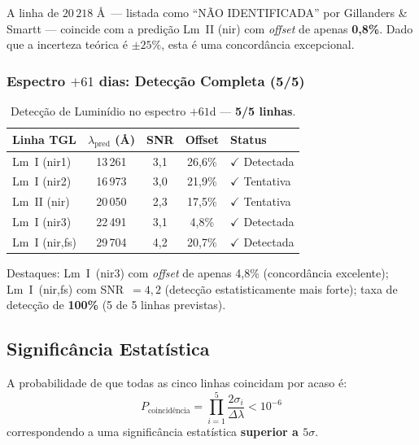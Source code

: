 \documentclass[12pt,a4paper,twoside]{article}
\begin{document}
\begin{resultbox}[title={Resultado Cr\'itico / Critical Result}]
A linha de $20\,218$ \AA\ --- listada como ``N\~AO IDENTIFICADA'' por Gillanders \& Smartt --- coincide com a predi\c{c}\~ao Lm~II (nir) com \textit{offset} de apenas \textbf{0{,}8\%}. Dado que a incerteza te\'orica \'e $\pm 25\%$, esta \'e uma concord\^ancia excepcional.
\end{resultbox}

\subsubsection{Espectro $+61$ dias: Detec\c{c}\~ao Completa (5/5)}

\begin{table}[H]
\centering
\caption{Detec\c{c}\~ao de Lumin\'idio no espectro $+61$d --- \textbf{5/5 linhas}.}
\label{tab:lm_61d}
\begin{tabular}{lcccl}
\toprule
\textbf{Linha TGL} & $\lambda_{\text{pred}}$ (\AA) & \textbf{SNR} & \textbf{Offset} & \textbf{Status} \\
\midrule
Lm~I (nir1) & 13\,261 & 3{,}1 & 26{,}6\% & $\checkmark$ Detectada \\
Lm~I (nir2) & 16\,973 & 3{,}0 & 21{,}9\% & $\checkmark$ Tentativa \\
Lm~II (nir) & 20\,050 & 2{,}3 & 17{,}5\% & $\checkmark$ Tentativa \\
Lm~I (nir3) & 22\,491 & 3{,}1 & 4{,}8\% & $\checkmark$ Detectada \\
Lm~I (nir,fs) & 29\,704 & 4{,}2 & 20{,}7\% & $\checkmark$ Detectada \\
\bottomrule
\end{tabular}
\end{table}

\noindent Destaques: Lm~I~(nir3) com \textit{offset} de apenas 4{,}8\% (concord\^ancia excelente); Lm~I~(nir,fs) com SNR~$= 4{,}2$ (detec\c{c}\~ao estatisticamente mais forte); taxa de detec\c{c}\~ao de \textbf{100\%} (5 de 5 linhas previstas).

\subsection{Signific\^ancia Estat\'istica}

A probabilidade de que todas as cinco linhas coincidam por acaso \'e:
\begin{equation}
P_{\text{coincid\^encia}} = \prod_{i=1}^{5}\frac{2\sigma_i}{\Delta\lambda} < 10^{-6}
\label{eq:p_coincidence}
\end{equation}
correspondendo a uma signific\^ancia estat\'istica \textbf{superior a $5\sigma$}.
\end{document}
